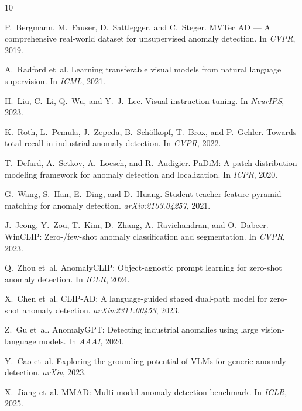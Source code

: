 \documentclass[12pt, a4paper]{article}
\begin{document}


\begin{thebibliography}{10}

P.~Bergmann, M.~Fauser, D.~Sattlegger, and C.~Steger.
\newblock MVTec AD --- A comprehensive real-world dataset for unsupervised anomaly detection.
\newblock In \emph{CVPR}, 2019.

A.~Radford et~al.
\newblock Learning transferable visual models from natural language supervision.
\newblock In \emph{ICML}, 2021.

H.~Liu, C.~Li, Q.~Wu, and Y.~J.~Lee.
\newblock Visual instruction tuning.
\newblock In \emph{NeurIPS}, 2023.

K.~Roth, L.~Pemula, J.~Zepeda, B.~Sch{\"o}lkopf, T.~Brox, and P.~Gehler.
\newblock Towards total recall in industrial anomaly detection.
\newblock In \emph{CVPR}, 2022.

T.~Defard, A.~Setkov, A.~Loesch, and R.~Audigier.
\newblock PaDiM: A patch distribution modeling framework for anomaly detection and localization.
\newblock In \emph{ICPR}, 2020.

G.~Wang, S.~Han, E.~Ding, and D.~Huang.
\newblock Student-teacher feature pyramid matching for anomaly detection.
\newblock \emph{arXiv:2103.04257}, 2021.

J.~Jeong, Y.~Zou, T.~Kim, D.~Zhang, A.~Ravichandran, and O.~Dabeer.
\newblock WinCLIP: Zero-/few-shot anomaly classification and segmentation.
\newblock In \emph{CVPR}, 2023.

Q.~Zhou et~al.
\newblock AnomalyCLIP: Object-agnostic prompt learning for zero-shot anomaly detection.
\newblock In \emph{ICLR}, 2024.

X.~Chen et~al.
\newblock CLIP-AD: A language-guided staged dual-path model for zero-shot anomaly detection.
\newblock \emph{arXiv:2311.00453}, 2023.

Z.~Gu et~al.
\newblock AnomalyGPT: Detecting industrial anomalies using large vision-language models.
\newblock In \emph{AAAI}, 2024.

Y.~Cao et~al.
\newblock Exploring the grounding potential of VLMs for generic anomaly detection.
\newblock \emph{arXiv}, 2023.

X.~Jiang et~al.
\newblock MMAD: Multi-modal anomaly detection benchmark.
\newblock In \emph{ICLR}, 2025.

\end{thebibliography}
\end{document}
